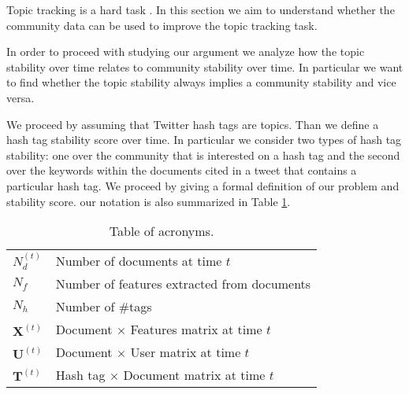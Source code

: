 Topic tracking is a hard task  \citemissing. In this section we aim to understand 
whether the community data can be used to improve the topic tracking task.

In order to proceed with studying our argument we analyze how the topic stability 
over time relates to community stability over time.
In particular we want to find whether the topic stability always implies a community
stability and vice versa.

We proceed by assuming that Twitter hash tags are topics. 
Than we define a hash tag stability score over time.
In particular we consider two types of hash tag stability: 
one over the community that is interested on a hash tag and 
the second over the keywords within the documents cited in a tweet 
that contains a particular hash tag.
We proceed by giving a formal definition of our problem and stability score. 
our notation is also summarized in Table \ref{tab:Symbols}.



\begin{table}[t]
\begin{center}
\caption{Table of acronyms.}
\begin{tabular}{  l   l  }
\hline\hline
{\sf $N_d^{(t)}$ }  &  Number of documents at time $t$ \\
{\sf $N_f$ }  &  Number of features extracted from documents \\
{\sf $N_h$ }  &  Number of \#tags \\
{\sf $\mathbf{X}^{(t)}$ }  &  Document $\times$ Features matrix at time $t$ \\
{\sf $\mathbf{U}^{(t)}$ }  &  Document $\times$ User matrix at time $t$ \\
{\sf $\mathbf{T}^{(t)}$ }  &  Hash tag $\times$ Document matrix at time $t$ \\
\hline \hline
\end{tabular}
\end{center}
\label{tab:Symbols}
\end{table}

%	



